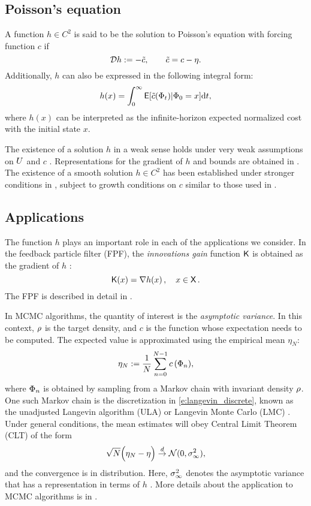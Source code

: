 \subsection{Poisson's equation}

A function $h\in C^2$ is said to be the solution to Poisson's equation with forcing function $c$ if
\begin{equation}
\generate h := - \tilc, \qquad  \tilc = c - \eta.
\label{e:poissons}
\end{equation}
Additionally, $h$ can also be expressed in the following integral form:
\begin{equation}
h(x) =\int_0^\infty {\sf E}[\tilde c(\Phi_t)|\Phi_0 = x] \text{d} t,
\end{equation}
where $h(x)$ can be interpreted as the infinite-horizon expected normalized cost with the initial state $x$. 

The existence of a solution $h$ in a weak sense holds under very weak assumptions on $U$ and $c$  \cite{glymey96a,konmey12a}.   Representations for the gradient of $h$ and bounds are obtained in \cite{laumehmeyrag15,devkonmey17b}.   The existence of  a  smooth solution $h\in C^2$ has been established under stronger conditions in \cite{parver01}, subject to growth conditions on $c$ similar to those used in  \cite{glymey96a}. 

\subsection{Applications} 
The function $h$ plays an important role in each of the applications we consider. In the feedback particle filter (FPF), the \textit{innovations gain} function $\text{\sf K}$ is obtained as  the gradient of $h$ \cite{yanmehmey13}:
\begin{equation}
\kFPF (x) = \nabla h(x)\, ,  \quad x\in\state\, .
\label{e:fpfgain}
\end{equation}
The FPF is described in detail in .

In MCMC algorithms, the quantity of interest is the \textit{asymptotic variance}. In this context, $\rho$ is the target density, and $c$ is the function whose expectation needs to be computed. The expected value is approximated using the empirical mean $\eta_N$:
\[ \eta_N := \frac{1}{N} \sum_{n=0}^{N-1} c\,(\Phi_n),\]
where $\Phi_n$ is obtained by sampling from a Markov chain with invariant density $\rho$. One such Markov chain is the discretization in \eqref{e:langevin_discrete}, known as the unadjusted Langevin algorithm (ULA) or Langevin Monte Carlo (LMC) \cite{}. Under general conditions, the mean estimates will obey Central Limit Theorem (CLT) of the form
\[
\sqrt{N} \Bigl( \eta_N - \eta \Bigr) \overset{d}{\to} \mathcal{N}(0,\sigma_\infty ^2),
\]
and the convergence is in distribution. Here, $\sigma_\infty^2$ denotes the asymptotic variance that has a representation in terms of $h$ \cite{glymey96a,MT,asmgly07}. More details about the application to MCMC algorithms is in . 

